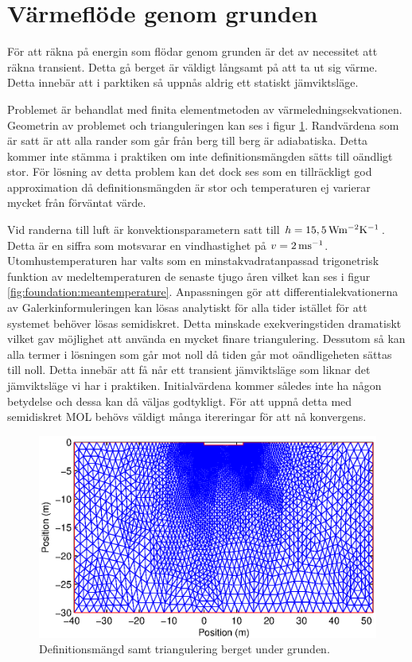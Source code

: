 \section{Värmeflöde genom grunden}

För att räkna på energin som flödar genom grunden är det av necessitet att räkna
transient. Detta gå berget är väldigt långsamt på att ta ut sig värme. Detta
innebär att i parktiken så uppnås aldrig ett statiskt jämviktsläge.

Problemet är behandlat med finita elementmetoden av värmeledningsekvationen.
Geometrin av problemet och trianguleringen kan ses i figur \ref{fig:foundation:tri}.
Randvärdena som är satt är att alla rander som går från berg till berg är adiabatiska.
Detta kommer inte stämma i praktiken om inte definitionsmängden sätts till oändligt
stor. För lösning av detta problem kan det dock ses som en tillräckligt god
approximation då definitionsmängden är stor och temperaturen ej varierar mycket
från förväntat värde.

Vid randerna till luft är konvektionsparametern satt
till $h = \unit[15,5]{Wm^{-2}K^{-1}}$. Detta är en siffra som motsvarar
en vindhastighet på $v = \unit[2]{ms^{-1}}$. Utomhustemperaturen har valts
som en minstakvadratanpassad trigonetrisk funktion av
medeltemperaturen de senaste tjugo åren vilket kan ses i figur
\ref{fig:foundation:meantemperature}. Anpassningen gör att
differentialekvationerna av Galerkinformuleringen kan lösas analytiskt
för alla tider istället för att systemet behöver lösas semidiskret.
Detta minskade exekveringstiden dramatiskt vilket gav möjlighet att använda en
mycket finare triangulering. Dessutom så kan alla termer i lösningen
som går mot noll då tiden går mot oändligeheten sättas till noll. Detta innebär
att få når ett transient jämviktsläge som liknar det jämviktsläge vi har i praktiken.
Initialvärdena kommer således inte ha någon betydelse och dessa kan då väljas
godtykligt. 
För att uppnå detta med semidiskret MOL behövs väldigt många itereringar för att
nå konvergens.

\begin{figure}
\centering
\includegraphics{images/trifoundation.eps}
\caption{Definitionsmängd samt triangulering berget under grunden.}
\label{fig:foundation:tri}
\end{figure}


